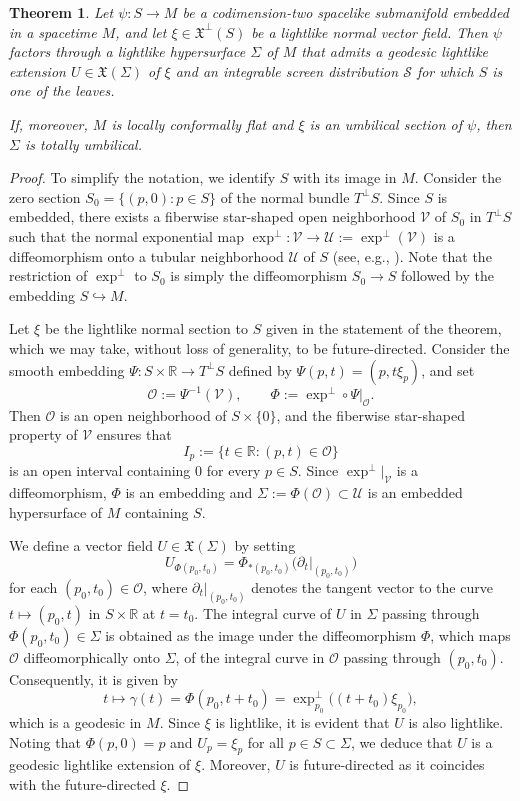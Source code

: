 \documentclass[11pt]{article}
\numberwithin{equation}{section}
\newtheorem{theorem}{Theorem}[section]
\begin{document}
	\begin{theorem}\label{factors}
Let $\psi\colon S\to M$ be a codimension-two spacelike submanifold
embedded in a spacetime $M$, and let
$\xi\in\mathfrak X^\perp(S)$ be a lightlike normal vector field.
Then $\psi$ factors through a lightlike hypersurface $\Sigma$ of $M$
that admits a geodesic lightlike extension
$U\in\mathfrak X(\Sigma)$ of $\xi$ and an integrable screen
distribution $\mathcal S$ for which $S$ is one of the leaves.

If, moreover, $M$ is locally conformally flat and $\xi$ is an
umbilical section of $\psi$, then $\Sigma$ is totally umbilical.
\end{theorem}
	\begin{proof}
	To simplify the notation, we identify $S$ with its image in $M$. Consider the zero section $S_0 = \{ (p, 0) : p \in S \}$ of the normal bundle $T^\perp S$. Since $S$ is embedded, there exists a fiberwise star-shaped open neighborhood $\mathscr V$ of $S_0$ in $T^\perp S$ such that the normal exponential map $\exp^\perp\colon\mathscr V\to\mathscr U:=\exp^\perp(\mathscr V)$ is a diffeomorphism onto a tubular neighborhood $\mathscr U$ of $S$ (see, e.g., \cite[Prop.~7.26]{oneill}). Note that the restriction of $\exp^\perp$ to $S_0$ is simply the diffeomorphism $S_0 \to S$ followed by the embedding $S \hookrightarrow M$.
	
		Let $\xi$ be the lightlike normal section to $S$ given in the statement of the theorem, which we may take, without loss of generality, to be future-directed. Consider the smooth embedding $\Psi \colon S \times \mathbb{R} \to T^\perp S$ defined by $\Psi(p,t) = (p, t\xi_p)$, and set
		\[
			\mathscr O:=\Psi^{-1}(\mathscr V),
			\qquad
			\Phi:=\exp^\perp\circ\Psi|_{\mathscr O}.
		\]
		Then $\mathscr O$ is an open neighborhood of $S\times\{0\}$, and the fiberwise star-shaped property of $\mathscr V$ ensures that
		\[
			I_p:=\{t\in\mathbb R:(p,t)\in\mathscr O\}
		\]
		is an open interval containing $0$ for every $p\in S$. Since $\exp^\perp|_{\mathscr V}$ is a diffeomorphism, $\Phi$ is an embedding and $\Sigma:=\Phi(\mathscr O)\subset\mathscr U$ is an embedded hypersurface of $M$ containing $S$.
		
	We define a vector field $U \in \mathfrak{X}(\Sigma)$ by setting
	\[
	U_{\Phi(p_0,t_0)} = \Phi_{*(p_0,t_0)}\bigl(\partial_t|_{(p_0,t_0)}\bigr)
	\]
	for each $(p_0, t_0) \in \mathscr{O}$, where $\partial_t|_{(p_0,t_0)}$ denotes the tangent vector to the curve $t \mapsto (p_0, t)$ in $S \times \mathbb{R}$ at $t = t_0$. The integral curve of $U$ in $\Sigma$ passing through $\Phi(p_0, t_0) \in \Sigma$ is obtained as the image under the diffeomorphism $\Phi$, which maps $\mathscr{O}$ diffeomorphically onto $\Sigma$, of the integral curve in $\mathscr{O}$ passing through $(p_0, t_0)$. Consequently, it is given by
	\[
	t \mapsto \gamma(t) = \Phi(p_0, t + t_0) = \exp^\perp_{p_0}\bigl((t + t_0)\xi_{p_0}\bigr),
	\]
	which is a geodesic in $M$. Since $\xi$ is lightlike, it is evident that $U$ is also lightlike. Noting that $\Phi(p, 0) = p$ and $U_p = \xi_p$ for all $p \in S \subset \Sigma$, we deduce that $U$ is a geodesic lightlike extension of $\xi$. Moreover, $U$ is future-directed as it coincides with the future-directed $\xi$.
		

\end{proof}
\end{document}
